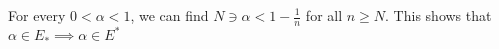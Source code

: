 \documentclass[preview]{standalone}
\begin{document}
\begin{center}
For every $0 < \alpha < 1$, we can find $N \ni \alpha < 1 - \frac{1}{n}$ for all $n \ge N$. This shows that $\alpha \in E_* \implies \alpha \in E^*$
\end{center}
\end{document}
